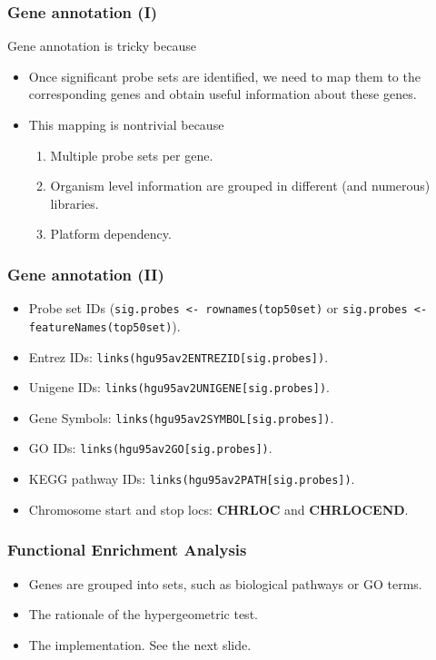 \begin{frame}
  \frametitle{Gene annotation (I)}
  Gene annotation is tricky because
  \begin{itemize}
  \item Once significant probe sets are identified, we need to map
    them to the corresponding genes and obtain useful information
    about these genes.
  \item This mapping is nontrivial because
    \begin{enumerate}
    \item Multiple probe sets per gene.
    \item Organism level information are grouped in different (and
      numerous) libraries.
    \item Platform dependency.
    \end{enumerate}
  \end{itemize}
\end{frame}

\begin{frame}
  \frametitle{Gene annotation (II)}
  \begin{itemize}
  \item Probe set IDs (\texttt{sig.probes <- rownames(top50set)} or
    \texttt{sig.probes <- featureNames(top50set)}).
  \item Entrez IDs: \texttt{links(hgu95av2ENTREZID[sig.probes])}.
  \item Unigene IDs: \texttt{links(hgu95av2UNIGENE[sig.probes])}.
  \item Gene Symbols: \texttt{links(hgu95av2SYMBOL[sig.probes])}.
  \item GO IDs: \texttt{links(hgu95av2GO[sig.probes])}.
  \item KEGG pathway IDs: \texttt{links(hgu95av2PATH[sig.probes])}.
  \item Chromosome start and stop locs: \textbf{CHRLOC} and
    \textbf{CHRLOCEND}.
  \end{itemize}
\end{frame}

\begin{frame}
  \frametitle{Functional Enrichment Analysis}
  \begin{itemize}
  \item Genes are grouped into sets, such as biological pathways or GO terms.
  \item The rationale of the hypergeometric test.
  \item The implementation. See the next slide.
  \end{itemize}
\end{frame}

